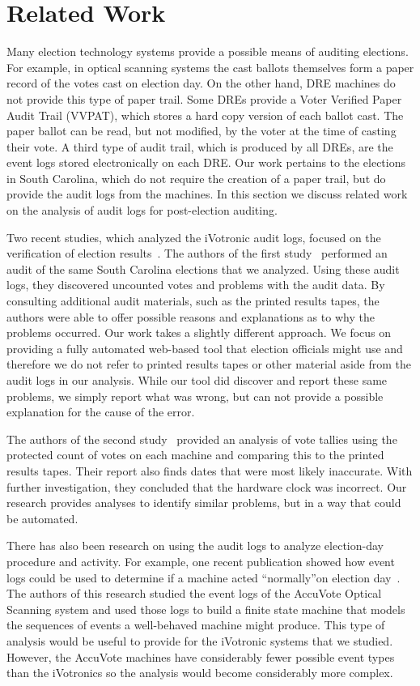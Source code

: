 \section{Related Work}
Many election technology systems provide a possible means of auditing elections. For example, in optical scanning systems the cast ballots themselves form a paper record of the votes cast on election day. On the other hand, DRE machines do not provide this type of paper trail. Some DREs provide a Voter Verified Paper Audit Trail (VVPAT), which stores a hard copy version of each ballot cast. The paper ballot can be read, but not modified, by the voter at the time of casting their vote. A third type of audit trail, which is produced by all DREs, are the event logs stored electronically on each DRE. Our work pertains to the elections in South Carolina, which do not require the creation of a paper trail, but do provide the audit logs from the machines. In this section we discuss related work on the analysis of audit logs for post-election auditing.

Two recent studies, which analyzed the iVotronic audit logs, focused on the verification of election results~\cite{Buell2011,Sandler2007}. The authors of the first study~\cite{Buell2011} performed an audit of the same South Carolina elections that we analyzed. Using these audit logs, they discovered uncounted votes and problems with the audit data. By consulting additional audit materials, such as the printed results tapes, the authors were able to offer possible reasons and explanations as to why the problems occurred. Our work takes a slightly different approach. We focus on providing a fully automated web-based tool that election officials might use and therefore we do not refer to printed results tapes or other material aside from the audit logs in our analysis. While our tool did discover and report these same problems, we simply report what was wrong, but can not provide a possible explanation for the cause of the error. 

The authors of the second study~\cite{Sandler2007} provided an analysis of vote tallies using the protected count of votes on each machine and comparing this to the printed results tapes. Their report also finds dates that were most likely inaccurate.  With further investigation, they concluded that the hardware clock was incorrect. Our research provides analyses to identify similar problems, but in a way that could be automated.

There has also been research on using the audit logs to analyze election-day procedure and activity. For example, one recent publication showed how event logs could be used to determine if a machine acted \textquotedblleft normally\textquotedblright on election day~\cite{Antonyan2009}. The authors of this research studied the event logs of the AccuVote Optical Scanning system and used those logs to build a finite state machine that models the sequences of events a well-behaved machine might produce. This type of analysis would be useful to provide for the iVotronic systems that we studied. However, the AccuVote machines have considerably fewer possible event types than the iVotronics so the analysis would become considerably more complex.

